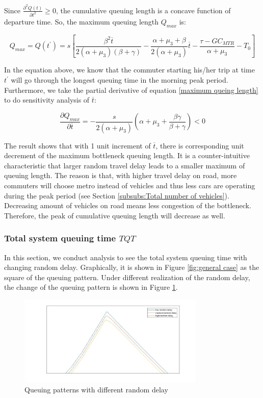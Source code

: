 \documentclass[a4paper,11pt]{article}
\begin{document}
Since $\frac{\partial^2 Q(t)}{\partial t^2} \geq 0$, the cumulative queuing length is a concave function of departure time. So, the maximum queuing length $Q_{max}$ is:

\begin{equation} \label{maximum queing length}
Q_{max} = Q(t^\prime) = s \left[\frac{\beta^2 \overline{t} }{2(\alpha+\mu_3)(\beta+\gamma)} - \frac{\alpha+\mu_3+\beta}{2(\alpha+\mu_3)}\overline{t} - \frac{\tau- GC_{MTR}}{\alpha+\mu_3} - T_0 \right]
\end{equation}

In the equation above, we know that the commuter starting his/her trip at time $t^\prime$ will go through the longest queuing time in the morning peak period. Furthermore, we take the partial derivative of equation \ref{maximum queing length} to do sensitivity analysis of $\overline{t}$:

\begin{equation} \label{partial Max Q}
\frac{\partial Q_{max}}{\partial \overline{t}} = -\frac{s}{2(\alpha+\mu_3)} \left(\alpha+\mu_3+\frac{\beta \gamma}{\beta+\gamma} \right) < 0
\end{equation}

The result shows that with 1 unit increment of $\overline{t}$, there is corresponding unit decrement of the maximum bottleneck queuing length. It is a counter-intuitive characteristic that larger random travel delay leads to a smaller maximum of queuing length. The reason is that, with higher travel delay on road, more commuters will choose metro instead of vehicles and thus less cars are operating during the peak period (see Section \ref{subsubs:Total number of vehicles}). Decreasing amount of vehicles on road means less congestion of the bottleneck. Therefore,  the peak of cumulative queuing length will decrease as well. 

\subsubsection{Total system queuing time $TQT$}\label{Total system queuing time}

In this section, we conduct analysis to see the total system queuing time with changing random delay. Graphically, it is shown in Figure \ref{fig:general case} as the square of the queuing pattern. Under different realization of the random delay, the change of the queuing pattern is shown in Figure \ref{fig:Queuing patterns with different random delay}.

\begin{figure}
	\centering
	\includegraphics[width=3.5in]{image/QP_tba.jpg}
	\caption{Queuing patterns with different random delay}
	\label{fig:Queuing patterns with different random delay}
\end{figure}
\end{document}
